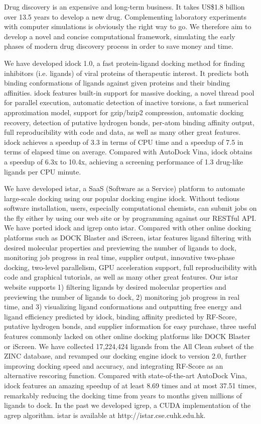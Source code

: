 Drug discovery is an expensive and long-term business. It takes US\$1.8 billion over 13.5 years to develop a new drug. Complementing laboratory experiments with computer simulations is obviously the right way to go. We therefore aim to develop a novel and concise computational framework, simulating the early phases of modern drug discovery process in order to save money and time.

We have developed idock 1.0, a fast protein-ligand docking method for finding inhibitors (i.e. ligands) of viral proteins of therapeutic interest. It predicts both binding conformations of ligands against given proteins and their binding affinities. idock features built-in support for massive docking, a novel thread pool for parallel execution, automatic detection of inactive torsions, a fast numerical approximation model, support for gzip/bzip2 compression, automatic docking recovery, detection of putative hydrogen bonds, per-atom binding affinity output, full reproducibility with code and data, as well as many other great features. idock achieves a speedup of 3.3 in terms of CPU time and a speedup of 7.5 in terms of elapsed time on average. Compared with AutoDock Vina, idock obtains a speedup of 6.3x to 10.4x, achieving a screening performance of 1.3 drug-like ligands per CPU minute.

We have developed istar, a SaaS (Software as a Service) platform to automate large-scale docking using our popular docking engine idock. Without tedious software installation, users, especially computational chemists, can submit jobs on the fly either by using our web site or by programming against our RESTful API. We have ported idock and igrep onto istar. Compared with other online docking platforms such as DOCK Blaster and iScreen, istar features ligand filtering with desired molecular properties and previewing the number of ligands to dock, monitoring job progress in real time, supplier output, innovative two-phase docking, two-level parallelism, GPU acceleration support, full reproducibility with code and graphical tutorials, as well as many other great features. Our istar website supports 1) filtering ligands by desired molecular properties and previewing the number of ligands to dock, 2) monitoring job progress in real time, and 3) visualizing ligand conformations and outputting free energy and ligand efficiency predicted by idock, binding affinity predicted by RF-Score, putative hydrogen bonds, and supplier information for easy purchase, three useful features commonly lacked on other online docking platforms like DOCK Blaster or iScreen. We have collected 17,224,424 ligands from the All Clean subset of the ZINC database, and revamped our docking engine idock to version 2.0, further improving docking speed and accuracy, and integrating RF-Score as an alternative rescoring function. Compared with state-of-the-art AutoDock Vina, idock features an amazing speedup of at least 8.69 times and at most 37.51 times, remarkably reducing the docking time from years to months given millions of ligands to dock. In the past we developed igrep, a CUDA implementation of the agrep algorithm. istar is available at http://istar.cse.cuhk.edu.hk.

